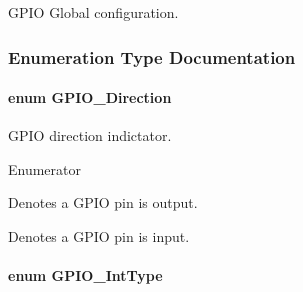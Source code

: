 G\-P\-I\-O Global configuration. 



\subsubsection{Enumeration Type Documentation}
\paragraph[{G\-P\-I\-O\-\_\-\-Direction}]{\setlength{\rightskip}{0pt plus 5cm}enum {\bf G\-P\-I\-O\-\_\-\-Direction}}\label{_g_p_i_o_8h_a0c1bff6c02d7155b78f07abd8c31722f}


G\-P\-I\-O direction indictator. 

\begin{Desc}
\item[Enumerator]\par
\begin{description}
\item[{\em 
G\-P\-I\-O\-\_\-\-O\-U\-T\-P\-U\-T\label{_g_p_i_o_8h_a0c1bff6c02d7155b78f07abd8c31722faa248e73c1faee9c6f072fd91569cf516}
}]Denotes a G\-P\-I\-O pin is output. \item[{\em 
G\-P\-I\-O\-\_\-\-I\-N\-P\-U\-T\label{_g_p_i_o_8h_a0c1bff6c02d7155b78f07abd8c31722faa1ea38ffc304a6c32480a65b5fec7302}
}]Denotes a G\-P\-I\-O pin is input. \end{description}
\end{Desc}
\paragraph[{G\-P\-I\-O\-\_\-\-Int\-Type}]{\setlength{\rightskip}{0pt plus 5cm}enum {\bf G\-P\-I\-O\-\_\-\-Int\-Type}}\label{_g_p_i_o_8h_abf424f4c82447febc105783bb24d66b0}


